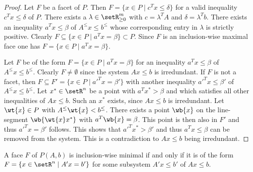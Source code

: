 \begin{proof}
  Let $F$ be a facet of $P$. Then $F = \{x \in P \mid c^Tx\leq\delta\}$ for a valid
  inequality $c^Tx\leq\delta$ of $P$. There exists a $\lambda \in \setR_{\geq0}^m$ with
  $c=\lambda^TA$ and $\delta=\lambda^Tb$.  There exists an inequality  $a^Tx\leq\beta$ of
  $A^\leq x\leq b^\leq$ whose corresponding entry in $\lambda$ is strictly
  positive. Clearly $F\subseteq\{x \in P \mid a^Tx=\beta\}\subset P$. Since $F$ is an
  inclusion-wise maximal face one has $F = \{x \in P \mid a^Tx=\beta\}$. 
  
  Let $F$ be of the form $F = \{ x \in P \mid a^Tx = \beta\}$ for an inequality
  $a^Tx\leq\beta$ of $A^\leq x\leq b^\leq$.  Clearly $F \neq \emptyset$ since the system $Ax\leq b$ is
  irredundant. If $F$ is not a facet, then $F\subseteq F'=\{ x \in P \mid a'^Tx = \beta'\}$
  with another inequality $a'^Tx\leq\beta'$ of $A^\leq x\leq b^\leq$. Let $x^*\in \setR^n$ be a point with
  $a^Tx^*>\beta$ and which satisfies all other inequalities of $Ax\leq b$. Such an $x^*$
  exists, since $Ax\leq b$ is irredundant.  Let $\wt{x}\in P$ with
  $A^\leq\wt{x}<b^\leq$.  There exists   a point $\wb{x}$ on the
  line-segment $\wb{\wt{x}x^*}$ with   $a^T\wb{x}=\beta$.  This point is then
  also in $F'$ and thus $a'^Tx = \beta'$ follows. This shows that
  $a'^Tx^*>\beta'$
  and thus $a^Tx\leq\beta$ can be
  removed from the system.  This is a contradiction to 
   $Ax\leq b$ being irredundant.  
\end{proof}




\begin{lemma}
  \label{po:lem:5}
  A face $F$ of $P(A,b)$ is inclusion-wise minimal if and only if it
  is of the form $F = \{ x \in \setR^n \mid A'x=b'\}$ for some subsystem
    $A'x\leq b'$ of $Ax\leq b$. 
\end{lemma}


